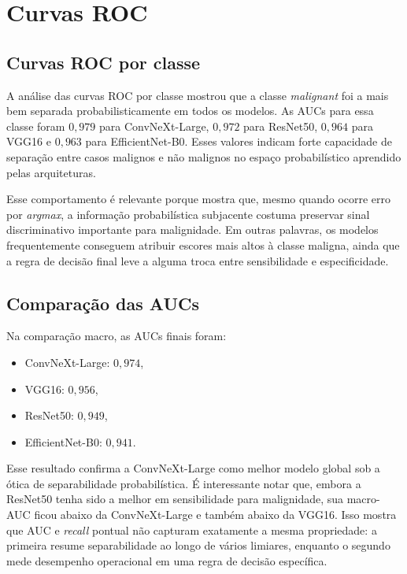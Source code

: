 \documentclass[tcc,capa]{texufpel}
\begin{document}
\section{Curvas ROC}

\subsection{Curvas ROC por classe}

A análise das curvas ROC por classe mostrou que a classe \textit{malignant} foi a mais bem separada probabilisticamente em todos os modelos. As AUCs para essa classe foram \(0{,}979\) para ConvNeXt-Large, \(0{,}972\) para ResNet50, \(0{,}964\) para VGG16 e \(0{,}963\) para EfficientNet-B0. Esses valores indicam forte capacidade de separação entre casos malignos e não malignos no espaço probabilístico aprendido pelas arquiteturas.

Esse comportamento é relevante porque mostra que, mesmo quando ocorre erro por \textit{argmax}, a informação probabilística subjacente costuma preservar sinal discriminativo importante para malignidade. Em outras palavras, os modelos frequentemente conseguem atribuir escores mais altos à classe maligna, ainda que a regra de decisão final leve a alguma troca entre sensibilidade e especificidade.

\subsection{Comparação das AUCs}

Na comparação macro, as AUCs finais foram:
\begin{itemize}
	\item ConvNeXt-Large: \(0{,}974\),
	\item VGG16: \(0{,}956\),
	\item ResNet50: \(0{,}949\),
	\item EfficientNet-B0: \(0{,}941\).
\end{itemize}

Esse resultado confirma a ConvNeXt-Large como melhor modelo global sob a ótica de separabilidade probabilística. É interessante notar que, embora a ResNet50 tenha sido a melhor em sensibilidade para malignidade, sua macro-AUC ficou abaixo da ConvNeXt-Large e também abaixo da VGG16. Isso mostra que AUC e \textit{recall} pontual não capturam exatamente a mesma propriedade: a primeira resume separabilidade ao longo de vários limiares, enquanto o segundo mede desempenho operacional em uma regra de decisão específica.
\end{document}
